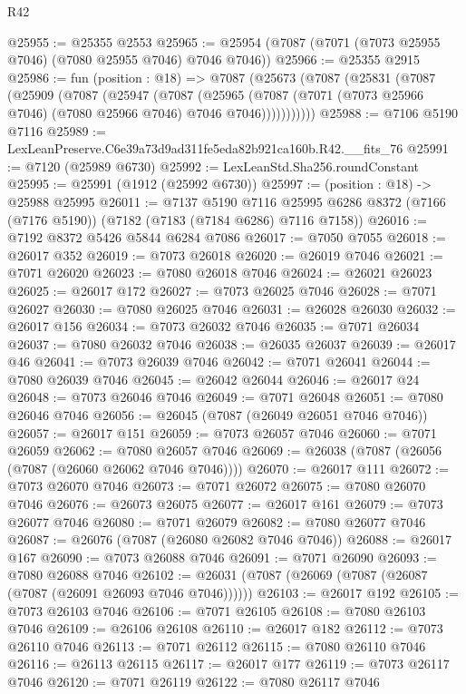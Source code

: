 \begin{lexlean}{R42}
\begin{coremodule}
{@25955 := @25355 @2553
@25965 := @25954 (@7087 (@7071 (@7073 @25955 @7046) (@7080 @25955 @7046) @7046 @7046))
@25966 := @25355 @2915
@25986 := fun (position : @18) =>
  @7087
    (@25673
      (@7087
        (@25831
          (@7087
            (@25909
              (@7087
                (@25947
                  (@7087
                    (@25965
                      (@7087 (@7071 (@7073 @25966 @7046) (@7080 @25966 @7046) @7046 @7046)))))))))))
@25988 := @7106 @5190 @7116
@25989 := LexLeanPreserve.C6e39a73d9ad311fe5eda82b921ca160b.R42.__fits_76
@25991 := @7120 (@25989 @6730)
@25992 := LexLeanStd.Sha256.roundConstant
@25995 := @25991 (@1912 (@25992 @6730))
@25997 := (position : @18) -> @25988 @25995
@26011 := @7137
    @5190
    @7116
    @25995
    @6286
    @8372
    (@7166 (@7176 @5190))
    (@7182 (@7183 (@7184 @6286) @7116 @7158))
@26016 := @7192 @8372 @5426 @5844 @6284 @7086
@26017 := @7050 @7055
@26018 := @26017 @352
@26019 := @7073 @26018
@26020 := @26019 @7046
@26021 := @7071 @26020
@26023 := @7080 @26018 @7046
@26024 := @26021 @26023
@26025 := @26017 @172
@26027 := @7073 @26025 @7046
@26028 := @7071 @26027
@26030 := @7080 @26025 @7046
@26031 := @26028 @26030
@26032 := @26017 @156
@26034 := @7073 @26032 @7046
@26035 := @7071 @26034
@26037 := @7080 @26032 @7046
@26038 := @26035 @26037
@26039 := @26017 @46
@26041 := @7073 @26039 @7046
@26042 := @7071 @26041
@26044 := @7080 @26039 @7046
@26045 := @26042 @26044
@26046 := @26017 @24
@26048 := @7073 @26046 @7046
@26049 := @7071 @26048
@26051 := @7080 @26046 @7046
@26056 := @26045 (@7087 (@26049 @26051 @7046 @7046))
@26057 := @26017 @151
@26059 := @7073 @26057 @7046
@26060 := @7071 @26059
@26062 := @7080 @26057 @7046
@26069 := @26038 (@7087 (@26056 (@7087 (@26060 @26062 @7046 @7046))))
@26070 := @26017 @111
@26072 := @7073 @26070 @7046
@26073 := @7071 @26072
@26075 := @7080 @26070 @7046
@26076 := @26073 @26075
@26077 := @26017 @161
@26079 := @7073 @26077 @7046
@26080 := @7071 @26079
@26082 := @7080 @26077 @7046
@26087 := @26076 (@7087 (@26080 @26082 @7046 @7046))
@26088 := @26017 @167
@26090 := @7073 @26088 @7046
@26091 := @7071 @26090
@26093 := @7080 @26088 @7046
@26102 := @26031 (@7087 (@26069 (@7087 (@26087 (@7087 (@26091 @26093 @7046 @7046))))))
@26103 := @26017 @192
@26105 := @7073 @26103 @7046
@26106 := @7071 @26105
@26108 := @7080 @26103 @7046
@26109 := @26106 @26108
@26110 := @26017 @182
@26112 := @7073 @26110 @7046
@26113 := @7071 @26112
@26115 := @7080 @26110 @7046
@26116 := @26113 @26115
@26117 := @26017 @177
@26119 := @7073 @26117 @7046
@26120 := @7071 @26119
@26122 := @7080 @26117 @7046
}
\end{coremodule}
\end{lexlean}
